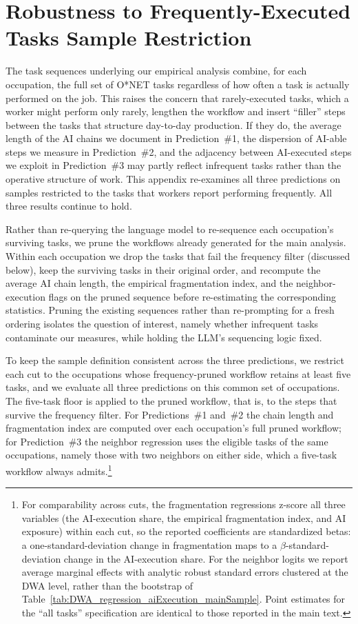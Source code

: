 \section{Robustness to Frequently-Executed Tasks Sample Restriction}
\label{app:frequency_robustness}

The task sequences underlying our empirical analysis combine, for each occupation, the full set of O*NET tasks regardless of how often a task is actually performed on the job.
This raises the concern that rarely-executed tasks, which a worker might perform only rarely, lengthen the workflow and insert ``filler'' steps between the tasks that structure day-to-day production.
If they do, the average length of the AI chains we document in Prediction~\#1, the dispersion of AI-able steps we measure in Prediction~\#2, and the adjacency between AI-executed steps we exploit in Prediction~\#3 may partly reflect infrequent tasks rather than the operative structure of work.
This appendix re-examines all three predictions on samples restricted to the tasks that workers report performing frequently.
All three results continue to hold.

Rather than re-querying the language model to re-sequence each occupation's surviving tasks, we prune the workflows already generated for the main analysis.
Within each occupation we drop the tasks that fail the frequency filter (discussed below), keep the surviving tasks in their original order, and recompute the average AI chain length, the empirical fragmentation index, and the neighbor-execution flags on the pruned sequence before re-estimating the corresponding statistics. 
Pruning the existing sequences rather than re-prompting for a fresh ordering isolates the question of interest, namely whether infrequent tasks contaminate our measures, while holding the LLM's sequencing logic fixed.

To keep the sample definition consistent across the three predictions, we restrict each cut to the occupations whose frequency-pruned workflow retains at least five tasks, and we evaluate all three predictions on this common set of occupations.
The five-task floor is applied to the pruned workflow, that is, to the steps that survive the frequency filter.
For Predictions~\#1 and~\#2 the chain length and fragmentation index are computed over each occupation's full pruned workflow; for Prediction~\#3 the neighbor regression uses the eligible tasks of the same occupations, namely those with two neighbors on either side, which a five-task workflow always admits.\footnote{For comparability across cuts, the fragmentation regressions z-score all three variables (the AI-execution share, the empirical fragmentation index, and AI exposure) within each cut, so the reported coefficients are standardized betas: a one-standard-deviation change in fragmentation maps to a $\beta$-standard-deviation change in the AI-execution share. For the neighbor logits we report average marginal effects with analytic robust standard errors clustered at the DWA level, rather than the bootstrap of Table~\ref{tab:DWA_regression_aiExecution_mainSample}. Point estimates for the ``all tasks'' specification are identical to those reported in the main text.}

